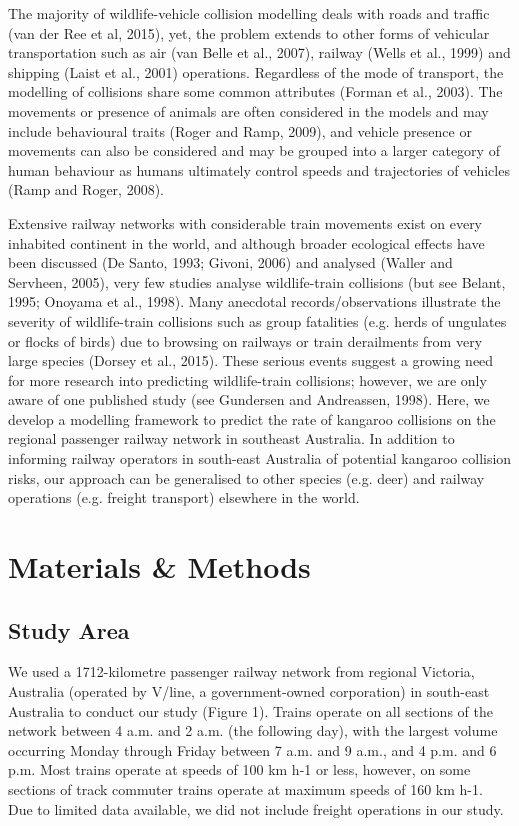 The majority of wildlife-vehicle collision modelling deals with roads and traffic (van der Ree et al, 2015), yet, the problem extends to other forms of vehicular transportation such as air (van Belle et al., 2007), railway (Wells et al., 1999) and shipping (Laist et al., 2001) operations. Regardless of the mode of transport, the modelling of collisions share some common attributes (Forman et al., 2003). The movements or presence of animals are often considered in the models and may include behavioural traits (Roger and Ramp, 2009), and vehicle presence or movements can also be considered and may be grouped into a larger category of human behaviour as humans ultimately control speeds and trajectories of vehicles (Ramp and Roger, 2008).

Extensive railway networks with considerable train movements exist on every inhabited continent in the world, and although broader ecological effects have been discussed (De Santo, 1993; Givoni, 2006) and analysed (Waller and Servheen, 2005), very few studies analyse wildlife-train collisions (but see Belant, 1995; Onoyama et al., 1998). Many anecdotal records/observations illustrate the severity of wildlife-train collisions such as group fatalities (e.g. herds of ungulates or flocks of birds) due to browsing on railways or train derailments from very large species (Dorsey et al., 2015). These serious events suggest a growing need for more research into predicting wildlife-train collisions; however, we are only aware of one published study (see Gundersen and Andreassen, 1998). Here, we develop a modelling framework to predict the rate of kangaroo collisions on the regional passenger railway network in southeast Australia. In addition to informing railway operators in south-east Australia of potential kangaroo collision risks, our approach can be generalised to other species (e.g. deer) and railway operations (e.g. freight transport) elsewhere in the world.

\section{Materials \& Methods}

\subsection{Study Area}

We used a 1712-kilometre passenger railway network from regional Victoria, Australia (operated by V/line, a government-owned corporation) in south-east Australia to conduct our study (Figure 1).  Trains operate on all sections of the network between 4 a.m. and 2 a.m. (the following day), with the largest volume occurring Monday through Friday between 7 a.m. and 9 a.m., and 4 p.m. and 6 p.m. Most trains operate at speeds of 100 km h-1 or less, however, on some sections of track commuter trains operate at maximum speeds of 160 km h-1. Due to limited data available, we did not include freight operations in our study.

